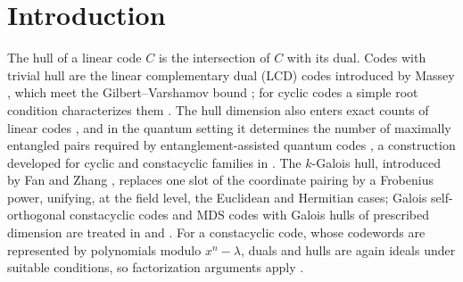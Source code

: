 \section{Introduction}\label{sec:intro}
The hull of a linear code $C$ is the intersection of $C$ with its dual.
Codes with trivial hull are the linear complementary dual (LCD) codes
introduced by Massey \cite{massey1992}, which meet the Gilbert--Varshamov
bound \cite{sendrier2004}; for cyclic codes a simple root condition
characterizes them \cite{yangMassey1994}. The hull dimension also enters exact
counts of linear codes \cite{sendrier1997}, and in the quantum setting it
determines the number of maximally entangled pairs required by
entanglement-assisted quantum codes \cite{brun2006,wildeBrun2008}, a
construction developed for cyclic and constacyclic families in
\cite{guendaJitmanGulliver2018}. The
$k$-Galois hull, introduced by Fan and Zhang \cite{fanZhang2017}, replaces
one slot of the coordinate pairing by a Frobenius power, unifying, at the
field level, the Euclidean and Hermitian cases; Galois self-orthogonal
constacyclic codes and MDS codes with Galois hulls of prescribed dimension are
treated in \cite{fuLiu2022} and \cite{cao2021}. For a constacyclic code, whose codewords are
represented by polynomials modulo $x^n-\lambda$, duals and hulls are again
ideals under suitable conditions, so factorization arguments apply
\cite{huffmanPless2003}.

